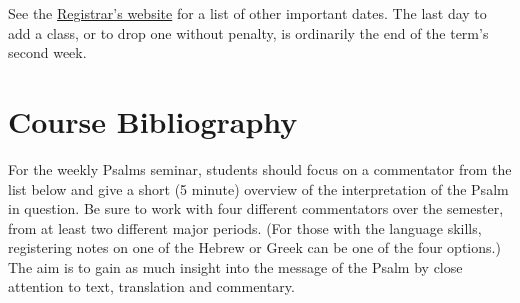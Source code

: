 \documentclass[titlepage]{article}
\begin{document}
See the \href{http://www.tyndale.ca/registrar/important-dates}{Registrar's
website} for a list of other important dates. The last day to add a class, or
to drop one without penalty, is ordinarily the end of the term's second week.

\section{Course Bibliography}
\label{bibliography}

For the weekly Psalms seminar, students should focus on a commentator
from the list below and give a short (5 minute) overview of the
interpretation of the Psalm in question. Be sure to work with four
different commentators over the semester, from at least two different
major periods. (For those with the language skills, registering notes on
one of the Hebrew or Greek can be one of the four options.) The aim is
to gain as much insight into the message of the Psalm by close attention
to text, translation and commentary.
\end{document}
